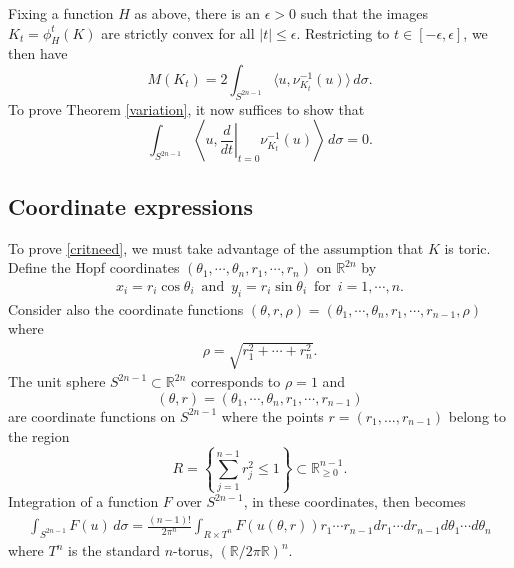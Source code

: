 \documentclass[12pt]{amsart}
\theoremstyle{definition}
\newcommand{\RR}{{\mathbb R}}
\begin{document}
Fixing  a function $H$ as above, there is an $\epsilon>0$ such that the images $K_t=\phi^t_H(K)$ are strictly convex for all $|t|\leq \epsilon$. Restricting to $t \in [-\epsilon, \epsilon]$, we then have 
$$M(K_t) = 2 \int_{S^{2n-1}} \langle u,\nu^{-1}_{K_t}(u)\rangle \, d \sigma.$$ To prove Theorem \ref{variation}, it now suffices to show that 
\begin{equation}\label{critneed}
\int_{S^{2n-1}} \left\langle u, \left.\frac{d}{dt}\right|_{t=0} \nu^{-1}_{K_t}(u)\right\rangle \, d \sigma =0.
\end{equation}

\subsection{Coordinate expressions} To prove \eqref{critneed}, we must take advantage of the assumption that $K$ is toric. Define the Hopf coordinates $(\theta_1, \cdots, \theta_n, r_1, \cdots, r_n)$ on $\RR^{2n}$ by
\begin{align*}
    x_i = r_i \cos{\theta_i}\,\,\,\text{and}\,\,\, y_i = r_i \sin{\theta_i} \,\,\,\text{for}\,\,\, i = 1, \cdots, n.
\end{align*}
Consider also the coordinate functions $(\theta,r,\rho)=(\theta_1, \cdots, \theta_n, r_1, \cdots, r_{n-1}, \rho)$ where
\begin{align*}
   \rho = \sqrt{r_1^2 + \cdots + r_n^2}.
\end{align*}
The unit sphere $S^{2n-1}\subset \RR^{2n}$ corresponds to $\rho=1$ and $$(\theta, r)=(\theta_1, \cdots, \theta_n, r_1, \cdots, r_{n-1})$$ are coordinate functions on $S^{2n-1}$ where the points $r =(r_1, \dots, r_{n-1})$ belong to the 
region $$\displaystyle{R=\left\{ \sum_{j=1}^{n-1} r_j^2 \leq 1\right\} \subset \RR^{n-1}_{\geq0}}.$$
Integration of a function $F$ over $S^{2n-1}$, in these coordinates, then becomes
\begin{align*}
    \int_{S^{2n-1}} F(u) \, d \sigma = \frac{(n-1)!}{2 \pi^n}\int_{R \times T^n} F(u(\theta,r))r_1 \cdots r_{n-1}d r_1 \cdots d r_{n-1} d \theta_1 \cdots d \theta_n
\end{align*}
where $T^n$ is the standard $n$-torus, $(\RR/2\pi\RR)^n$.  
\end{document}
